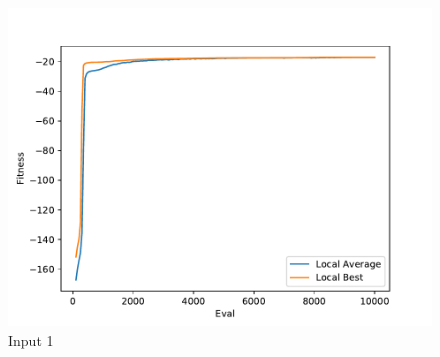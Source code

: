 \documentclass{standalone}
\begin{document}
\begin{figure}[!htb]
	\caption{Input 1}
	\label{fig:graph_1078}
	\includegraphics[width=\textwidth]{../graphs/graphs/1078.pdf}
\end{figure}
\end{document}
